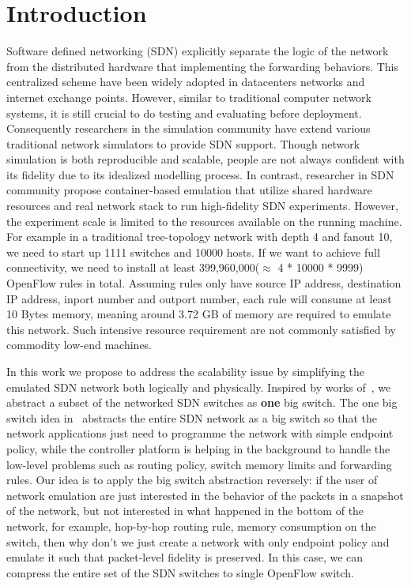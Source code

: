 \section{Introduction}

Software defined networking (SDN) explicitly separate the logic of the network
from the distributed hardware that implementing the forwarding behaviors.
This centralized scheme have been widely adopted in datacenters networks
and internet exchange points\cite{B4, Meridian, SDX}.
However, similar to traditional computer network systems, it is still crucial to do testing
and evaluating before deployment.
Consequently researchers in the simulation community have extend various
traditional network simulators to provide SDN support\cite{S3F, NS3, OPNET}.
Though network simulation is both reproducible and scalable,
people are not always confident with its fidelity due to its idealized modelling process.
In contrast, researcher in SDN community propose container-based emulation that utilize
shared hardware resources and real network stack to run high-fidelity SDN experiments\cite{Mininet}.
However, the experiment scale is limited to the resources available on the running machine.
For example in a traditional tree-topology network with depth 4 and fanout 10,
we need to start up 1111 switches and 10000 hosts.
If we want to achieve full connectivity, we need to install at least 399,960,000($\approx$ 4 * 10000 * 9999)
OpenFlow rules in total.
Assuming rules only have source IP address, destination IP address, inport number and outport number,
each rule will consume at least 10 Bytes memory, meaning around 3.72 GB of memory are required to
emulate this network.
Such intensive resource requirement are not commonly satisfied by commodity low-end machines.

In this work we propose to address the scalability issue by simplifying the emulated
SDN network both logically and physically.
Inspired by works of~\cite{OneBigSwitchAbstraction},
we abstract a subset of the networked SDN switches as \textbf{one} big switch.
The one big switch idea in~\cite{OneBigSwitchAbstraction} abstracts the entire SDN network as
a big switch so that the network applications just need to programme the network with simple
endpoint policy, while the controller platform is helping in the background to handle
the low-level problems such as routing policy, switch memory limits and forwarding rules.
Our idea is to apply the big switch abstraction reversely:
if the user of network emulation are just interested in the behavior of the packets in
a snapshot of the network, but not interested in what happened in the bottom of the network,
for example, hop-by-hop routing rule, memory consumption on the switch, then why don't we
just create a network with only endpoint policy and emulate it such that packet-level
fidelity is preserved.
In this case, we can compress the entire set of the SDN switches to single OpenFlow switch.

